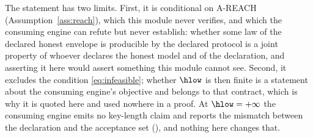 \begin{remark}
The statement has two limits. First, it is conditional on A-REACH
(Assumption~\ref{ass:reach}), which this module never verifies, and which the
consuming engine can refute but never establish: whether some
law of the declared honest envelope is producible by the declared protocol
is a joint property of whoever declares the honest model and of the
declaration, and asserting it here would assert something this module cannot
see. Second, it excludes the condition \eqref{eq:infeasible}; whether $\hlow$
is then finite is a statement about the consuming engine's objective and
belongs to that contract, which is why it is quoted here and used nowhere in
a proof. At $\hlow=+\infty$ the consuming engine emits no key-length claim
and reports the mismatch between the declaration and the acceptance set
(), and nothing here changes that.
\end{remark}
